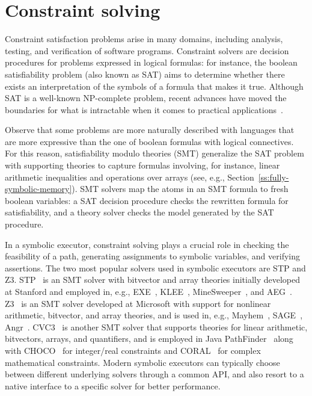 
\section{Constraint solving}
\label{se:constraint-solving}

Constraint satisfaction problems arise in many domains, including analysis, testing, and verification of software programs. Constraint solvers are decision procedures for problems expressed in logical formulas: for instance, the boolean satisfiability problem (also known as SAT) aims to determine whether there exists an interpretation of the symbols of a formula that makes it true. Although SAT is a well-known NP-complete problem, recent advances have moved the boundaries for what is intractable when it comes to practical applications~\cite{SMT-CACM11}. 

Observe that some problems are more naturally described with languages that are more expressive than the one of boolean formulas with logical connectives. For this reason, satisfiability modulo theories (SMT) generalize the SAT problem with supporting theories to capture formulas involving, for instance, linear arithmetic inequalities and operations over arrays (see, e.g., Section~\ref{ss:fully-symbolic-memory}). SMT solvers map the atoms in an SMT formula to fresh boolean variables: a SAT decision procedure checks the rewritten formula for satisfiability, and a theory solver checks the model generated by the SAT procedure.

In a symbolic executor, constraint solving plays a crucial role in checking the feasibility of a path, generating assignments to symbolic variables, and verifying assertions. The two most popular solvers used in symbolic executors are STP and Z3. STP~\cite{STP-CAV07,STP-TR07} is an SMT solver with bitvector and array theories initially developed at Stanford and employed in, e.g., {\sc EXE}~\cite{EXE-CCS06}, {\sc KLEE}~\cite{KLEE-OSDI08}, {\sc MineSweeper}~\cite{MineSweeper-BOTNET08}, and {\sc AEG}~\cite{AEG-NDSS11}. Z3~\cite{Z3-TACS08} is an SMT solver developed at Microsoft with support for nonlinear arithmetic, bitvector, and array theories, and is used in, e.g., {\sc Mayhem}~\cite{MAYHEM-SP12}, {\sc SAGE}~\cite{SAGE-QUEUE12}, {\sc Angr}~\cite{ANGR-SSP16}. CVC3~\cite{CVC3-CAV07} is another SMT solver that supports theories for linear arithmetic, bitvectors, arrays, and quantifiers, and is employed in {\sc Java PathFinder}~\cite{PATHFINDER-ASE10} along with CHOCO~\cite{CHOCO} for integer/real constraints and CORAL~\cite{CORAL-NFM11} for complex mathematical constraints. Modern symbolic executors can typically choose between different underlying solvers through a common API, and also resort to a native interface to a specific solver for better performance.


